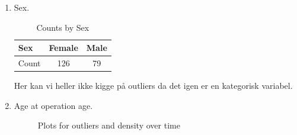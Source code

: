 \begin{enumerate}
\item Sex.\\
\begin{table}[h!]
    \centering
    \begin{tabular}{|l|c|c|}
        \hline
        Sex & Female & Male \\
        \hline
        Count & 126 & 79 \\
        \hline
    \end{tabular}
    \caption{Counts by Sex}
    \label{tab:sex}
\end{table}
Her kan vi heller ikke kigge på outliers da det igen er en kategorisk variabel.
\newpage
\item Age at operation age.
\newline
\begin{figure}[h]
    \centering
 \hfill
  \hfill
  \caption{Plots for outliers and density over time}
\end{figure}


\end{enumerate}
